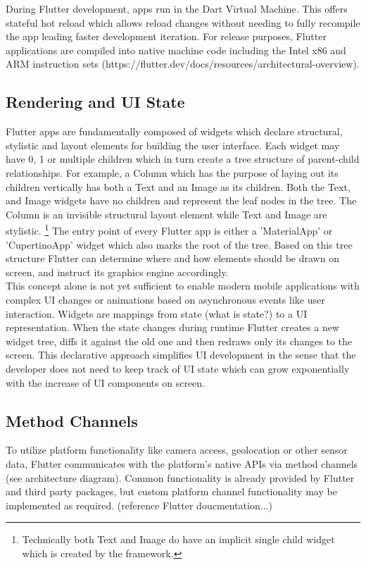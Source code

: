 During Flutter development, apps run in the Dart Virtual Machine. This offers stateful hot reload which allows reload changes without needing 
to fully recompile the app leading faster development iteration.
For release purposes, Flutter applications are compiled into native machine code including the Intel x86 and ARM instruction sets
(https://flutter.dev/docs/resources/architectural-overview).


\subsection{Rendering and UI State}
Flutter apps are fundamentally composed of widgets which declare structural, stylistic and layout elements for building the user interface. 
Each widget may have 0, 1 or multiple children which in turn create a tree structure of parent-child relationships. 
For example, a Column which has the purpose of laying out its children vertically has both a Text and an Image as its children. Both the Text,
and Image widgets have no children and represent the leaf nodes in the tree. The Column is an invisible structural layout element while Text and 
Image are stylistic.
\footnote{Technically both Text and Image do have an implicit single child widget which is created by the framework.}
The entry point of every Flutter app is either a 'MaterialApp' or 'CupertinoApp' widget which also marks the root of the tree.
Based on this tree structure Flutter can determine where and how elements should be drawn on screen, and instruct its graphics engine accordingly.\\
This concept alone is not yet sufficient to enable modern mobile applications with complex UI changes or animations 
based on asynchronous events like user interaction. 
Widgets are mappings from state (what is state?) to a UI representation. When the state changes during runtime Flutter creates a new widget tree, 
diffs it against the old one and then redraws only its changes to the screen.
This declarative approach simplifies UI development in the sense that the developer does not need to keep track of UI state which can grow exponentially
with the increase of UI components on screen. 

\subsection{Method Channels}
To utilize platform functionality like camera access, geolocation or other sensor data, Flutter communicates with the platform's native APIs via 
method channels (see architecture diagram). Common functionality is already provided by Flutter and third party packages, but custom platform channel
functionality may be implemented as required. (reference Flutter doucmentation...)

